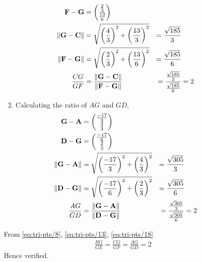 \documentclass[11pt]{book}
\begin{document}
\begin{enumerate}[label=\thesection.\arabic*.,ref=\thesection.\theenumi]
\begin{enumerate}
\begin{align}
		\label{eq:tri-pts/10} \vec{F}-\vec{G} &= \myvec{\frac{2}{3} \\ \frac{13}{6}} \\
		\label{eq:tri-pts/11} \norm{\vec{G}-\vec{C}} &= \sqrt{\brak{\frac{4}{3}}^{2} + \brak{\frac{13}{3}}^{2}} &= \frac{\sqrt{185}}{3} \\  
		\label{eq:tri-pts/12} \norm{\vec{F}-\vec{G}} &= \sqrt{\brak{\frac{2}{3}}^{2} + \brak{\frac{13}{6}}^{2}} &= \frac{\sqrt{185}}{6} \\
		\label{eq:tri-pts/13}\frac{CG}{GF} &= \frac{\norm{\vec{G}-\vec{C}}}{\norm{\vec{F}-\vec{G}}} &= \frac{\frac{\sqrt{185}}{3}}{\frac{\sqrt{185}}{6}} &= 2		
\end{align}
\item Calculating the ratio of $AG$ and $GD$,
\begin{align}
		\label{eq:tri-pts/14} \vec{G}-\vec{A} &= \myvec{\frac{-17}{3} \\ \frac{4}{3}} \\
		\label{eq:tri-pts/15} \vec{D}-\vec{G} &= \myvec{\frac{-17}{6} \\ \frac{2}{3}} \\
		\label{eq:tri-pts/16} \norm{\vec{G}-\vec{A}} &= \sqrt{\brak{\frac{-17}{3}}^{2} + \brak{\frac{4}{3}}^{2}} &= \frac{\sqrt{305}}{3} \\
		\label{eq:tri-pts/17} \norm{\vec{D}-\vec{G}} &= \sqrt{\brak{\frac{-17}{6}}^{2}+\brak{\frac{2}{3}}^{2}} &= \frac{\sqrt{305}}{6} \\
		\label{eq:tri-pts/18}\frac{AG}{GD} &= \frac{\norm{\vec{G}-\vec{A}}}{\norm{\vec{D}-\vec{G}}} &= \frac{\frac{\sqrt305}{3}}{\frac{\sqrt{305}}{6}} &= 2 
\end{align}
\end{enumerate}

From \eqref{eq:tri-pts/8}, \eqref{eq:tri-pts/13}, \eqref{eq:tri-pts/18}
\begin{align}
		\frac{BG}{GE} = 
		\frac{CG}{GF} =
		\frac{AG}{GD} = 2
\end{align}
Hence verified.




\end{enumerate}
\end{document}
